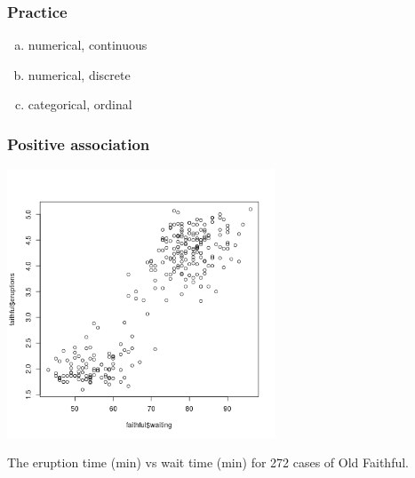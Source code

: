 
\begin{frame}
\frametitle{Practice}


\begin{enumerate}[(a)]
\item numerical, continuous
\item numerical, discrete
\item categorical, ordinal
\end{enumerate}

\end{frame}




\begin{frame}
\frametitle{Positive association}

\begin{center}
\includegraphics[width=0.6\textwidth]{1-2_data_basics/figures/faithful/faithful}
\end{center}

\small
The eruption time (min) vs wait time (min) for 272 cases of Old Faithful.

\end{frame}

